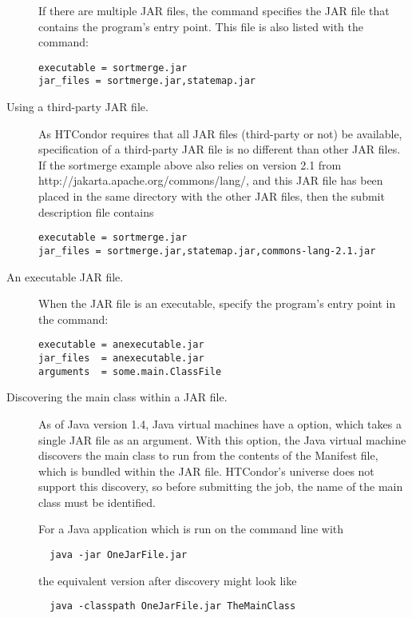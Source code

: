 \begin{description}
If there are multiple JAR files,
the  command specifies the JAR file
that contains the program's entry point.
This file is also listed with the  command:
\begin{verbatim}
executable = sortmerge.jar
jar_files = sortmerge.jar,statemap.jar
\end{verbatim}

\item[Using a third-party JAR file.]
As HTCondor requires that all JAR files (third-party or not)
be available,
specification of a third-party JAR file is no different than
other JAR files.
If the sortmerge example above also relies on
version 2.1 from http://jakarta.apache.org/commons/lang/,
and this JAR file has been placed in the same directory with
the other JAR files, then the submit description file contains
\footnotesize
\begin{verbatim}
executable = sortmerge.jar
jar_files = sortmerge.jar,statemap.jar,commons-lang-2.1.jar
\end{verbatim}
\normalsize

\item[An executable JAR file.]
When the JAR file is an executable, 
specify the program's entry point in the 
command:
\begin{verbatim}
executable = anexecutable.jar
jar_files  = anexecutable.jar
arguments  = some.main.ClassFile
\end{verbatim}

\item[Discovering the main class within a JAR file.]
As of Java version 1.4, 
Java virtual machines have a  option,
which takes a single JAR file as an argument.
With this option, 
the Java virtual machine discovers the main class to run 
from the contents of the Manifest file,
which is bundled within the JAR file.  
HTCondor's  universe does not support this discovery,
so before submitting the job,
the name of the main class must be identified.

For a Java application which is run on the command line with

\begin{verbatim}
  java -jar OneJarFile.jar
\end{verbatim}

the equivalent version after discovery might look like

\begin{verbatim}
  java -classpath OneJarFile.jar TheMainClass
\end{verbatim}


\end{description}
